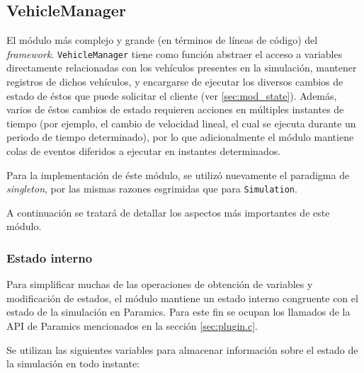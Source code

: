 \subsection{VehicleManager}\label{sec:vehiclemanager}

El módulo más complejo y grande (en términos de líneas de código) del \emph{framework}. \texttt{VehicleManager} tiene como función abstraer el acceso a variables directamente relacionadas con los vehículos presentes en la simulación, mantener registros de dichos vehículos, y encargarse de ejecutar los diversos cambios de estado de éstos que puede solicitar el cliente (ver \ref{sec:mod_state}). Además, varios de éstos cambios de estado requieren acciones en múltiples instantes de tiempo (por ejemplo, el cambio de velocidad lineal, el cual se ejecuta durante un periodo de tiempo determinado), por lo que adicionalmente el módulo mantiene colas de eventos diferidos a ejecutar en instantes determinados.

Para la implementación de éste módulo, se utilizó nuevamente el paradigma de \emph{singleton}, por las mismas razones esgrimidas que para \texttt{Simulation}.

A continuación se tratará de detallar los aspectos más importantes de este módulo.

\subsubsection{Estado interno}\label{sec:internalstate}

Para simplificar muchas de las operaciones de obtención de variables y modificación de estados, el módulo mantiene un estado interno congruente con el estado de la simulación en Paramics. Para este fin se ocupan los llamados de la API de Paramics mencionados en la sección \ref{sec:plugin.c}.

Se utilizan las siguientes variables para almacenar información sobre el estado de la simulación en todo instante:

